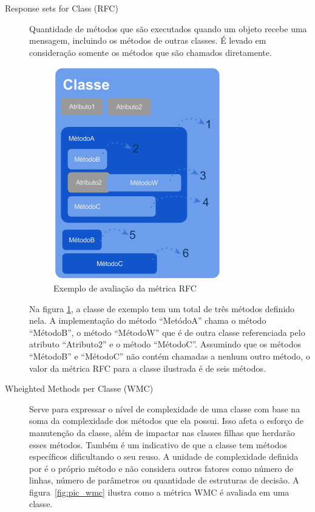 \begin{description}



\item[Response sets for Class (RFC)] Quantidade de métodos que são executados
quando um objeto recebe uma mensagem, incluindo os métodos de outras classes. É
levado em consideração somente os métodos que são chamados diretamente.

\begin{figure}[htb]
	\caption{\label{fig:pic_rfc}Exemplo de avaliação da métrica RFC}
	\begin{center}
		\includegraphics[scale=0.6]{img/pic_rfc.png}
	\end{center}
\end{figure}


Na figura \ref{fig:pic_rfc}, a classe de exemplo tem um total de três métodos
definido nela. A implementação do método ``MetódoA'' chama o método ``MétodoB'',
o método ``MétodoW'' que é de outra classe referenciada pelo atributo
``Atributo2'' e o método ``MétodoC''. Assumindo que os métodos ``MétodoB'' e
``MétodoC'' não contém chamadas a nenhum outro método, o valor da métrica RFC
para a classe ilustrada é de seis métodos.

\item[Wheighted Methods per Classe (WMC)] Serve para expressar o nível de
complexidade de uma classe com base na soma da complexidade dos métodos que ela
possui. Isso afeta o esforço de manutenção da classe, além de impactar nas
classes filhas que herdarão esses métodos. Também é um indicativo de que a
classe tem métodos específicos dificultando o seu reuso. A unidade de
complexidade definida por  é o próprio método e não
considera outros fatores como número de linhas, número de parâmetros ou
quantidade de estruturas de decisão. A figura~\ref{fig:pic_wmc} ilustra como a
métrica WMC é avaliada em uma classe.


\end{description}
